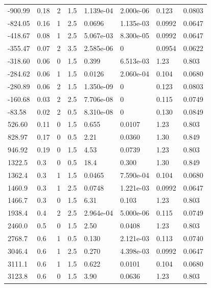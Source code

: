 \documentclass[preview]{standalone}
\begin{document}
{{\begin{tabular}{L{1.2cm}C{1.2cm} C{0.3cm}C{0.5cm} C{1.4cm}C{1.4cm} C{1.4cm}C{1.4cm}}
  -900.99  &  0.18  & 2     & 1.5 &  1.139e-04  & 2.000e-06  & 0.123 &  0.0803   \\ 
  -824.05  &  0.16  & 1     & 2.5 &  0.0696  & 1.135e-03  & 0.0992 &  0.0647   \\ 
  -418.67  &  0.08  & 1     & 2.5 &  5.067e-03  & 8.300e-05  & 0.0992 &  0.0647   \\ 
  -355.47  &  0.07  & 2     & 3.5 &  2.585e-06  & 0  & 0.0954 &  0.0622   \\ 
  -318.60  &  0.06  & 0     & 1.5 &  0.399  & 6.513e-03  & 1.23 &  0.803   \\ 
  -284.62  &  0.06  & 1     & 1.5 &  0.0126  & 2.060e-04  & 0.104 &  0.0680   \\ 
  -280.89  &  0.06  & 2     & 1.5 &  1.350e-09  & 0  & 0.123 &  0.0803   \\ 
  -160.68  &  0.03  & 2     & 2.5 &  7.706e-08  & 0  & 0.115 &  0.0749   \\ 
  -83.58  &  0.02  & 2     & 0.5 &  8.310e-08  & 0  & 0.130 &  0.0849   \\ 
  526.60  &  0.11  & 0     & 1.5 &  0.655  & 0.0107  & 1.23 &  0.803   \\ 
  828.97  &  0.17  & 0     & 0.5 &  2.21  & 0.0360  & 1.30 &  0.849   \\ 
  946.92  &  0.19  & 0     & 1.5 &  4.53  & 0.0739  & 1.23 &  0.803   \\ 
  1322.5  &   0.3  & 0     & 0.5 &  18.4  & 0.300  & 1.30 &  0.849   \\ 
  1362.4  &   0.3  & 1     & 1.5 &  0.0465  & 7.590e-04  & 0.104 &  0.0680   \\ 
  1460.9  &   0.3  & 1     & 2.5 &  0.0748  & 1.221e-03  & 0.0992 &  0.0647   \\ 
  1466.7  &   0.3  & 0     & 1.5 &  6.31  & 0.103  & 1.23 &  0.803   \\ 
  1938.4  &   0.4  & 2     & 2.5 &  2.964e-04  & 5.000e-06  & 0.115 &  0.0749   \\ 
  2460.0  &   0.5  & 0     & 1.5 &  2.50  & 0.0408  & 1.23 &  0.803   \\ 
  2768.7  &   0.6  & 1     & 0.5 &  0.130  & 2.121e-03  & 0.113 &  0.0740   \\ 
  3046.4  &   0.6  & 1     & 2.5 &  0.270  & 4.398e-03  & 0.0992 &  0.0647   \\ 
  3111.1  &   0.6  & 1     & 1.5 &  0.622  & 0.0101  & 0.104 &  0.0680   \\ 
  3123.8  &   0.6  & 0     & 1.5 &  3.90  & 0.0636  & 1.23 &  0.803   \\ 

\end{tabular}}}
\end{document}
